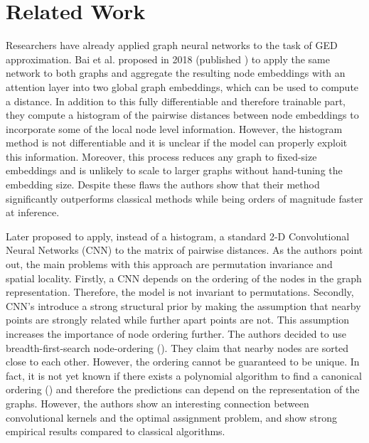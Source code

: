 \section{Related Work}

Researchers have already applied graph neural networks to the task of GED approximation. Bai et al. proposed in 2018 (published \citealp{bai2019}) to apply the same network to both graphs and aggregate the resulting node embeddings with an attention layer into two global graph embeddings, which can be used to compute a distance. In addition to this fully differentiable and therefore trainable part, they compute a histogram of the pairwise distances between node embeddings to incorporate some of the local node level information. However, the histogram method is not differentiable and it is unclear if the model can properly exploit this information. Moreover, this process reduces any graph to fixed-size embeddings and is unlikely to scale to larger graphs without hand-tuning the embedding size. Despite these flaws the authors show that their method significantly outperforms classical methods while being orders of magnitude faster at inference.

Later \cite{bai2018_cnn1} proposed to apply, instead of a histogram, a standard 2-D Convolutional Neural Networks (CNN) to the matrix of pairwise distances. As the authors point out, the main problems with this approach are permutation invariance and spatial locality. Firstly, a CNN depends on the ordering of the nodes in the graph representation. Therefore, the model is not invariant to permutations. Secondly, CNN's introduce a strong structural prior by making the assumption that nearby points are strongly related while further apart points are not. This assumption increases the importance of node ordering further. The authors decided to use breadth-first-search node-ordering (\citealp{bfs2018}). They claim that nearby nodes are sorted close to each other. However, the ordering cannot be guaranteed to be unique. In fact, it is not yet known if there exists a polynomial algorithm to find a canonical ordering (\citealp{canonical2016}) and therefore the predictions can depend on the representation of the graphs. However, the authors show an interesting connection between convolutional kernels and the optimal assignment problem, and show strong empirical results compared to classical algorithms.

